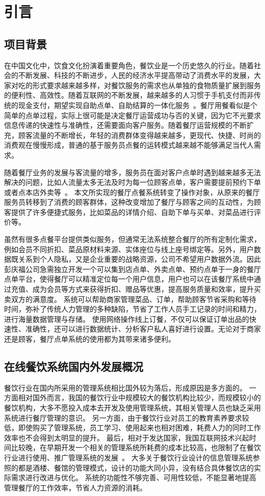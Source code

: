 \chapter{引言}

\section{项目背景}
在中国文化中，饮食文化扮演着重要角色，餐饮业是一个历史悠久的行业。随着社会的不断发展、科技的不断进步，人民的经济水平提高带动了消费水平的发展，大家对吃的形式要求越来越多样，对餐饮服务的需求也从单独的食物质量扩展到服务的便利性、高效性。随着互联网的不断发展，越来越多的人习惯于手机支付而非传统的现金支付，期望实现自助点单、自助结算的一体化服务~\cite{lee2016innovation}。餐厅用餐看似是个简单的点单过程，实际上很可能是决定餐厅运营成功与否的关键，因为它不光要求信息传递的快速性与准确性，还需要面向客户服务。随着餐厅运营规模的不断扩充，顾客流量的不断增长，年轻的消费群体变得越来越多，更现代、快捷、时尚的消费观在慢慢形成，普通的基于服务员点餐的运转模式越来越不能够满足当代人需求。

随着餐厅业务的发展与客流量的增多，服务员在面对客户点单时遇到越来越多无法解决的问题，比如人流量太多无法及时为每一位顾客点单，客户需要提前预约下单或者点本店外卖等~\cite{harman2015systems}。
本文所实现的餐厅点餐系统转变了操作对象，从原来的餐厅服务员转移到了消费的顾客群体，这种改变增加了餐厅与顾客之间的互动性，为顾客提供了许多便捷式服务，比如菜品的详情介绍、自助下单与买单、对菜品进行评价等。

虽然有很多点餐平台提供类似服务，但通常无法系统整合餐厅的所有定制化需求，例如会员不同折扣、菜品原材料来源、实体座位与线上座号绑定等。另外，用户数据既关系到个人隐私，又是企业重要的战略资源，公司不希望用户数据外流。因此彭庆福公司急需独立开发一个可以集到店点单、外卖点单、预约点单于一身的餐厅点单平台，使得餐厅可以精准定位每一个用户信息，用户也可以在该餐厅系统中通过充值、成为会员等方式来获得折扣、赠品等优惠，提高服务质量和效率，提升买卖双方的满意度。
系统可以帮助商家管理菜品、订单，帮助顾客节省采购和等待时间，弥补了传统人力管理的多种缺陷，节省了工作人员手工记录的时间和精力，进行海量数据管理与存储。
使用网络操作线上订餐，不仅可以保证订单出品的快速性、准确性，还可以进行数据统计、分析客户私人喜好进行设置。无论对于商家还是顾客，餐厅点单系统的使用都为其带来诸多便利。

\section{在线餐饮系统国内外发展概况}
餐饮行业在国内所采用的管理系统相比国外较为落后，形成原因是多方面的。
一方面相对国外而言，我国的餐饮行业中规模较大的餐饮机构比较少，而规模较小的餐饮机构，大多不愿投入成本去开发及使用管理系统，其相关管理人员也缺乏采用系统进行餐厅管理的意识。
另一方面，由于餐饮行业对员工的教育素养要求较低，即使购买了管理系统，员工学习、使用起来也相对困难，耗费人力的同时工作效率也不会得到太明显的提升。
最后，相对于发达国家，我国互联网技术兴起时间比较晚，在早期开发一个相关的管理系统所耗费的成本比较高，也限制了在餐饮行业进行使用、推广管理系统的发展~\cite{Du2019/10}。
大多关于餐饮行业设计的信息管理系统参照的都是酒楼、餐馆的管理模式，设计的功能大同小异，没有结合具体餐饮店的实际需求进行改进与优化。
系统的功能性不够完善、可用性较低，不能显著地提高管理餐厅的工作效率，节省人力资源的消耗。

